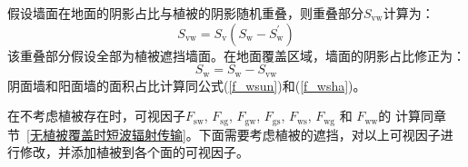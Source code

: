 假设墙面在地面的阴影占比与植被的阴影随机重叠，则重叠部分$S_{\mathrm{vw}}$计算为：
\begin{equation}
  S_{\mathrm{v w}}=S_{\mathrm{v}}\left(S_{\mathrm{w}}-S_{\mathrm{w}}^{\prime}\right)
\end{equation}
该重叠部分假设全部为植被遮挡墙面。在地面覆盖区域，墙面的阴影占比修正为：
\begin{equation}\label{S_w2}
  S_{\mathrm{w}}=S_{\mathrm{w}}-S_{\mathrm{v w}}
\end{equation}
阴面墙和阳面墙的面积占比计算同公式(\ref{f_wsun})和(\ref{f_wsha})。

在不考虑植被存在时，可视因子$F_{\mathrm{sw}}$, $F_{\mathrm{sg}}$, $F_{\mathrm{gw}}$, $F_{\mathrm{gs}}$, $F_{\mathrm{ws}}$, $F_{\mathrm{wg}}$ 和 $F_{\mathrm{ww}}$的
计算同章节~\ref{无植被覆盖时短波辐射传输}。下面需要考虑植被的遮挡，对以上可视因子进行修改，并添加植被到各个面的可视因子。


